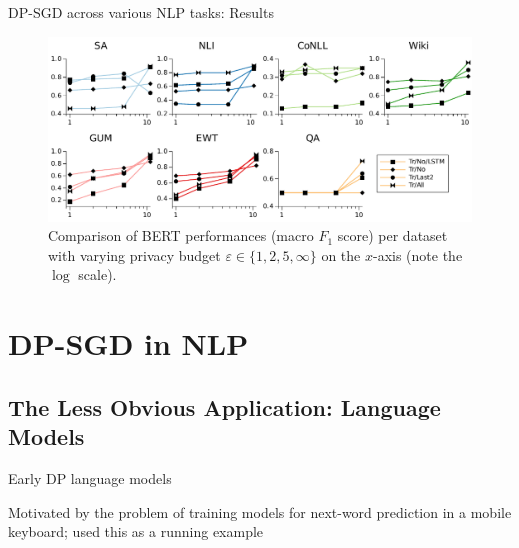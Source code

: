 \documentclass[12pt,aspectratio=169,handout]{beamer}
\begin{document}
\begin{frame}{DP-SGD across various NLP tasks: Results}


\begin{figure}
	\includegraphics[width=\linewidth]{img/plot-fig2.pdf}
	\caption{\label{fig:performance-by-task} Comparison of BERT performances (macro $F_1$ score) per dataset with varying privacy budget $\varepsilon \in \{1, 2, 5, \infty \}$ on the $x$-axis (note the $\log$ scale).}
\end{figure}



\end{frame}


\section{DP-SGD in NLP}

\subsection{The Less Obvious Application: Language Models}

\begin{frame}{Early DP language models}

Motivated by the problem of training models for next-word prediction in a mobile keyboard; used this as a running example


\end{frame}
\end{document}
